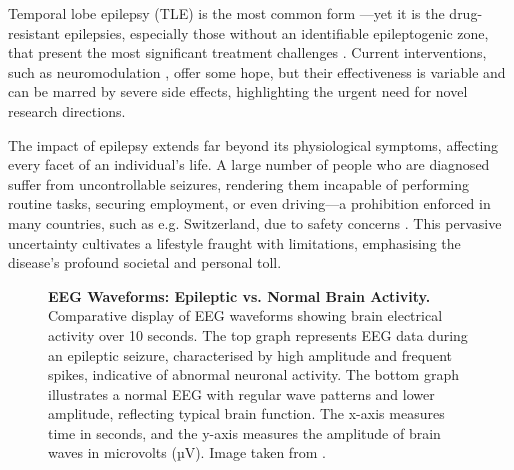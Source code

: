 \documentclass[10pt]{article}
\begin{document}
\begin{sloppypar}
  Temporal lobe epilepsy (TLE) is the most common form \citep{epilepsy_foundation_temporal_2019}—yet it is the drug-resistant epilepsies, especially those without an identifiable epileptogenic zone, that present the most significant treatment challenges \citep{iwasaki_non-invasive_2016, guery_clinical_2021}. Current interventions, such as neuromodulation \citep{fisher_electrical_2014}, offer some hope, but their effectiveness is variable and can be marred by severe side effects, highlighting the urgent need for novel research directions.

  The impact of epilepsy extends far beyond its physiological symptoms, affecting every facet of an individual’s life. A large number of people who are diagnosed suffer from uncontrollable seizures, rendering them incapable of performing routine tasks, securing employment, or even driving—a prohibition enforced in many countries, such as e.g. Switzerland, due to safety concerns \citep{schweizerische_epilepsieliga_driving_2021}. This pervasive uncertainty cultivates a lifestyle fraught with limitations, emphasising the disease’s profound societal and personal toll.

  \begin{figure}[ht]
    \centering
    \caption[EEG Waveforms: Epileptic vs. Normal Brain Activity]{\textbf{EEG Waveforms: Epileptic vs. Normal Brain Activity.} Comparative display of EEG waveforms showing brain electrical activity over 10 seconds. The top graph represents EEG data during an epileptic seizure, characterised by high amplitude and frequent spikes, indicative of abnormal neuronal activity. The bottom graph illustrates a normal EEG with regular wave patterns and lower amplitude, reflecting typical brain function. The x-axis measures time in seconds, and the y-axis measures the amplitude of brain waves in microvolts (µV). Image taken from \cite{espinosa_feedforward_2020}.}
    \label{fig:seizure-eeg}
  \end{figure}


\end{sloppypar}
\end{document}
